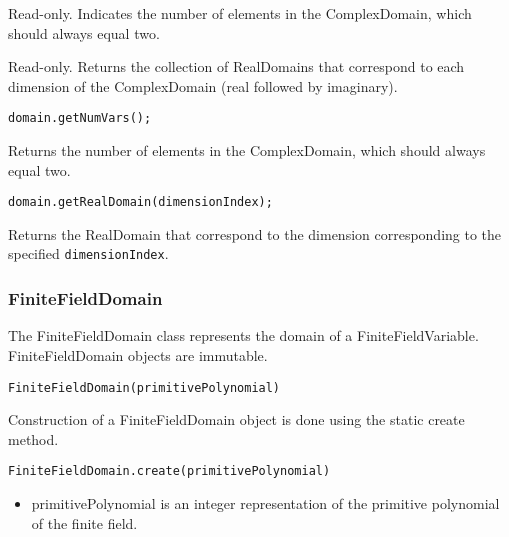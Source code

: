 
\ifmatlab
{}

Read-only.  Indicates the number of elements in the ComplexDomain, which should always equal two.
\fi


Read-only.  Returns the collection of RealDomains that correspond to each dimension of the ComplexDomain (real followed by imaginary).


\ifjava
{}


\begin{lstlisting}
domain.getNumVars();
\end{lstlisting}

Returns the number of elements in the ComplexDomain, which should always equal two.


\begin{lstlisting}
domain.getRealDomain(dimensionIndex);
\end{lstlisting}

Returns the RealDomain that correspond to the dimension corresponding to the specified \texttt{dimensionIndex}.

\fi



\subsubsection{FiniteFieldDomain}
\label{sec:FiniteFieldDomain}

The FiniteFieldDomain class represents the domain of a FiniteFieldVariable.  FiniteFieldDomain objects are immutable.


\ifmatlab
\begin{lstlisting}
FiniteFieldDomain(primitivePolynomial)
\end{lstlisting}
\fi

\ifjava
Construction of a FiniteFieldDomain object is done using the static create method.

\begin{lstlisting}
FiniteFieldDomain.create(primitivePolynomial)
\end{lstlisting}
\fi

\begin{itemize}
\item primitivePolynomial is an integer representation of the primitive polynomial of the finite field.
\end{itemize}


